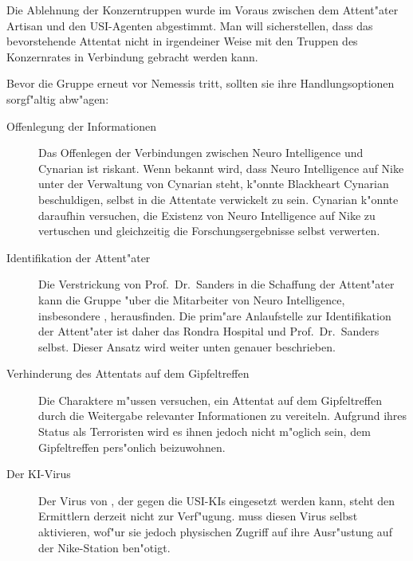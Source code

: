 \begin{remarks}
	Die Ablehnung der Konzerntruppen wurde im Voraus zwischen dem Attent"ater Artisan und den USI-Agenten abgestimmt. Man will sicherstellen, dass das bevorstehende Attentat nicht in irgendeiner Weise mit den Truppen des Konzernrates in Verbindung gebracht werden kann.
\end{remarks}


Bevor die Gruppe erneut vor Nemessis tritt, sollten sie ihre Handlungsoptionen sorgf"altig abw"agen:

\begin{description}
	\item[Offenlegung der Informationen] Das Offenlegen der Verbindungen zwischen Neuro Intelligence und Cynarian ist riskant. Wenn bekannt 
		wird, dass Neuro Intelligence auf Nike unter der Verwaltung von Cynarian steht, k"onnte Blackheart Cynarian beschuldigen, selbst in die Attentate verwickelt zu sein. Cynarian k"onnte daraufhin versuchen, die Existenz von Neuro Intelligence auf Nike zu vertuschen und gleichzeitig die Forschungsergebnisse selbst verwerten.
	\item[Identifikation der Attent"ater] Die Verstrickung von Prof.~Dr.~Sanders in die Schaffung der Attent"ater kann die Gruppe "uber die 
		Mitarbeiter von Neuro Intelligence, insbesondere \ml{}, herausfinden. Die prim"are Anlaufstelle zur Identifikation der Attent"ater ist daher das Rondra Hospital und Prof.~Dr.~Sanders selbst. Dieser Ansatz wird weiter unten genauer beschrieben.		
	\item[Verhinderung des Attentats auf dem Gipfeltreffen] Die Charaktere m"ussen versuchen, ein Attentat auf dem Gipfeltreffen durch die 
		Weitergabe relevanter Informationen zu vereiteln. Aufgrund ihres Status als Terroristen wird es ihnen jedoch nicht m"oglich sein, dem Gipfeltreffen pers"onlich beizuwohnen.
	\item[Der KI-Virus] Der Virus von \ml{}, der gegen die USI-KIs eingesetzt werden kann, steht den Ermittlern derzeit nicht zur 
		Verf"ugung. \ml{} muss diesen Virus selbst aktivieren, wof"ur sie jedoch physischen Zugriff auf ihre Ausr"ustung auf der Nike-Station ben"otigt.
\end{description}

